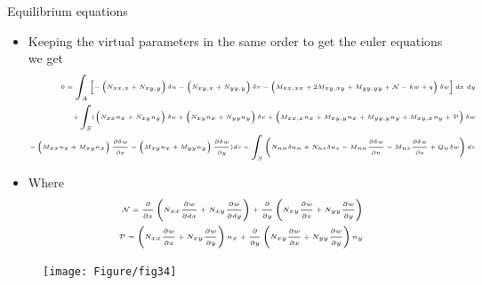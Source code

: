 	\begin{frame}{Equilibrium equations}
		\begin{itemize}
			\item Keeping the virtual parameters in the same order to get the euler equations we get
			\begin{equation}
			\tiny
			\begin{aligned}
				0 = \int_A \left[ -\left(N_{xx,x} + N_{xy,y}\right)\delta u - \left( N_{xy,x} + N_{yy,y}\right)\delta v
		  			- \left(M_{xx,xx} + 2M_{xy,xy} + M_{yy,yy} + \mathcal{N} - kw + q\right) \delta w
							\right] dx~dy \\
				+ \int_S  (\left(N_{xx}n_x + N_{xy}n_y \right)\delta u  
			  + \left(N_{xy}n_x + N_{yy}n_y \right)\delta v
			  + \left( M_{xx,x}n_x + M_{xy,y}n_x + M_{yy,y}n_y + M_{xy,x}n_y + \mathcal{P} \right) \delta w \\
			  - \left(M_{xx}n_x + M_{xy}n_x \right)\frac{\partial \delta w}{\partial x} 
			  -\left(M_{xy}n_x + M_{yy}n_y \right)\frac{\partial \delta w}{\partial y} )ds  
			  -\int_S \left(N_{nn} \delta u_n + N_{ns}\delta u_s - M_{nn}\frac{\partial \delta w}{\partial n} - M_{ns}\frac{\partial \delta w}{\partial s} + Q_n \delta w \right)ds
			\end{aligned}
			\end{equation}
			\item Where 
				\begin{equation}
				\tiny
					\begin{aligned}
					\mathcal{N} = \frac{\partial }{\partial x} \left(N_{xx}\frac{\partial w}{\partial dx}   + N_{xy}\frac{\partial w}{\partial dy}\right)
					 + \frac{\partial }{\partial y} \left(N_{xy}\frac{\partial w}{\partial x} 
					+ N_{yy}\frac{\partial w}{\partial y}\right) \\
					\mathcal{P} = \left(N_{xx}\frac{\partial w}{\partial x}   + N_{xy}\frac{\partial w}{\partial y}\right) n_x
					+ \frac{\partial }{\partial y} \left(N_{xy}\frac{\partial w}{\partial x} 
					+ N_{yy}\frac{\partial w}{\partial y}\right) n_y 
					\end{aligned}
				\end{equation}
		\end{itemize}
	\end{frame}


	\begin{frame}
		\begin{figure}
			\centering
			\texttt{[image: Figure/fig34]} 		
		\end{figure}
	\end{frame}


